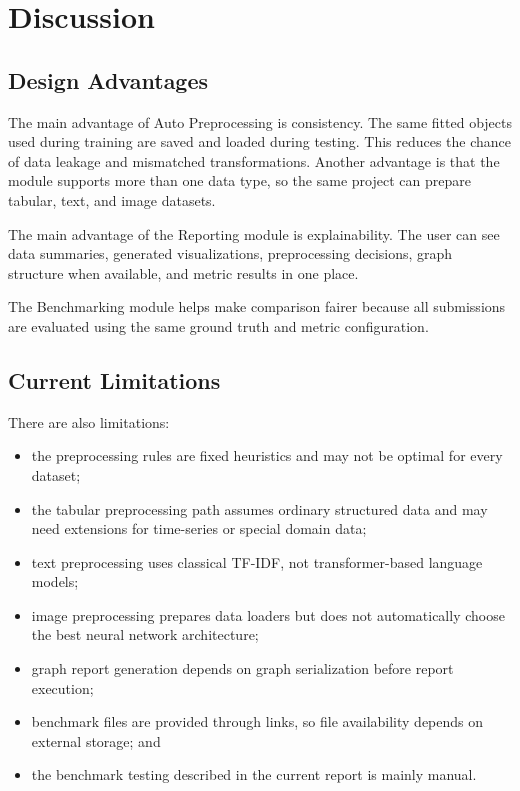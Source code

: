 \documentclass[12pt,a4paper,oneside]{report}
\begin{document}
\chapter{Discussion}
\label{chap:discussion}

\section{Design Advantages}

The main advantage of Auto Preprocessing is consistency. The same fitted
objects used during training are saved and loaded during testing. This reduces
the chance of data leakage and mismatched transformations. Another advantage is
that the module supports more than one data type, so the same project can
prepare tabular, text, and image datasets.

The main advantage of the Reporting module is explainability. The user can see
data summaries, generated visualizations, preprocessing decisions, graph
structure when available, and metric results in one place.

The Benchmarking module helps make comparison fairer because all submissions
are evaluated using the same ground truth and metric configuration.

\section{Current Limitations}

There are also limitations:

\begin{itemize}[leftmargin=*]
  \item the preprocessing rules are fixed heuristics and may not be optimal for
        every dataset;
  \item the tabular preprocessing path assumes ordinary structured data and may
        need extensions for time-series or special domain data;
  \item text preprocessing uses classical TF-IDF, not transformer-based
        language models;
  \item image preprocessing prepares data loaders but does not automatically
        choose the best neural network architecture;
  \item graph report generation depends on graph serialization before
        report execution;
  \item benchmark files are provided through links, so file availability
        depends on external storage; and
  \item the benchmark testing described in the current report is mainly manual.
\end{itemize}
\end{document}
